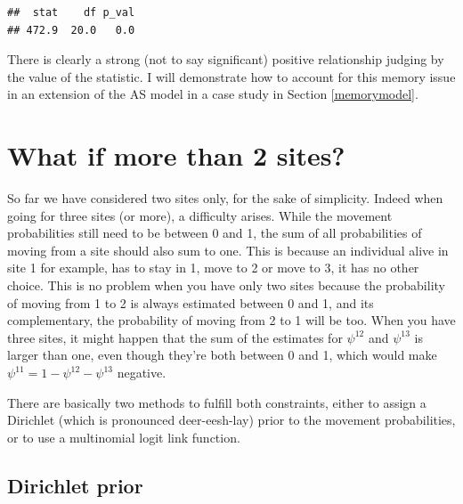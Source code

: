 \documentclass[
  12pt,
]{krantz}
\begin{document}
\begin{verbatim}
##  stat    df p_val 
## 472.9  20.0   0.0
\end{verbatim}

There is clearly a strong (not to say significant) positive relationship judging by the value of the statistic. I will demonstrate how to account for this memory issue in an extension of the AS model in a case study in Section \ref{memorymodel}.

\section{What if more than 2 sites?}\label{what-if-more-than-2-sites}

So far we have considered two sites only, for the sake of simplicity. Indeed when going for three sites (or more), a difficulty arises. While the movement probabilities still need to be between 0 and 1, the sum of all probabilities of moving from a site should also sum to one. This is because an individual alive in site 1 for example, has to stay in 1, move to 2 or move to 3, it has no other choice. This is no problem when you have only two sites because the probability of moving from 1 to 2 is always estimated between 0 and 1, and its complementary, the probability of moving from 2 to 1 will be too. When you have three sites, it might happen that the sum of the estimates for \(\psi^{12}\) and \(\psi^{13}\) is larger than one, even though they're both between 0 and 1, which would make \(\psi^{11} = 1 - \psi^{12} - \psi^{13}\) negative.

There are basically two methods to fulfill both constraints, either to assign a Dirichlet (which is pronounced deer-eesh-lay) prior to the movement probabilities, or to use a multinomial logit link function.

\subsection{Dirichlet prior}\label{dirichletprior}
\end{document}
